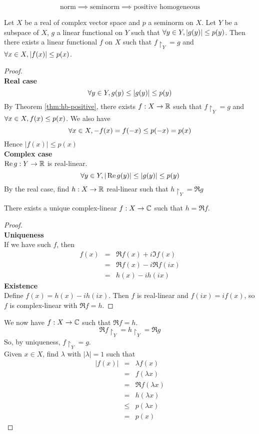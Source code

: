 \documentclass{article}
\begin{document}
\begin{rmk}
  $$\text{norm} \implies \text{seminorm} \implies \text{positive homogeneous}$$
\end{rmk}

\newlec

\begin{nthm}\label{thm:hb-absolute}
  Let $X$ be a real of complex vector space and $p$ a seminorm on $X$. Let $Y$ be a subspace of $X$, $g$ a linear functional on $Y$ such that $\forall y \in Y, |g(y)| \le p(y)$. Then there exists a linear functional $f$ on $X$ such that $f\restriction_Y = g$ and $\forall x \in X, |f(x)| \le p(x)$.
\end{nthm}
\begin{proof}~\\
  {\bf Real case}
  $$\forall y \in Y, g(y) \le |g(y)| \le p(y)$$
  By Theorem \ref{thm:hb-positive}, there exists $f : X \rightarrow \mathbb R$ such that $f\restriction_Y = g$ and $\forall x \in X, f(x) \le p(x)$. We also have
  $$\forall x \in X, -f(x) = f(-x) \le p(-x) = p(x)$$
  Hence $|f(x)| \le p(x)$ \\
  {\bf Complex case} \\
  $\operatorname{Re} g : Y \rightarrow \mathbb R$ is real-linear.
  $$\forall y \in Y, |\operatorname{Re} g(y)| \le |g(y)| \le p(y)$$
  By the real case, find $h : X \rightarrow \mathbb R$ real-linear such that $h\restriction_Y = \Re g$
  \begin{claim}
    There exists a unique complex-linear $f : X \rightarrow \mathbb C$ such that $h = \Re f$.
  \end{claim}
  \begin{proof}~\\
    {\bf Uniqueness} \\
    If we have such $f$, then
    \begin{eqnarray*}
      f(x)
      & = & \Re f(x) + i\Im f(x) \\
      & = & \Re f(x) - i\Re f(ix) \\
      & = & h(x) - ih(ix)
    \end{eqnarray*}
    {\bf Existence} \\
    Define $f(x) = h(x) - ih(ix)$. Then $f$ is real-linear and $f(ix) = if(x)$, so $f$ is complex-linear with $\Re f = h$.
  \end{proof}
  We now have $f : X \rightarrow \mathbb C$ such that $\Re f = h$.
  $$\Re f\restriction_Y = h\restriction_Y = \Re g$$
  So, by uniqueness, $f\restriction_Y = g$. \\
  Given $x \in X$, find $\lambda$ with $|\lambda| = 1$ such that
  \begin{eqnarray*}
    |f(x)|
    & = & \lambda f(x) \\
    & = & f(\lambda x) \\
    & = & \Re f(\lambda x) \\
    & = & h(\lambda x) \\
    & \le & p(\lambda x) \\
    & = & p(x)
  \end{eqnarray*}
\end{proof}
\end{document}
